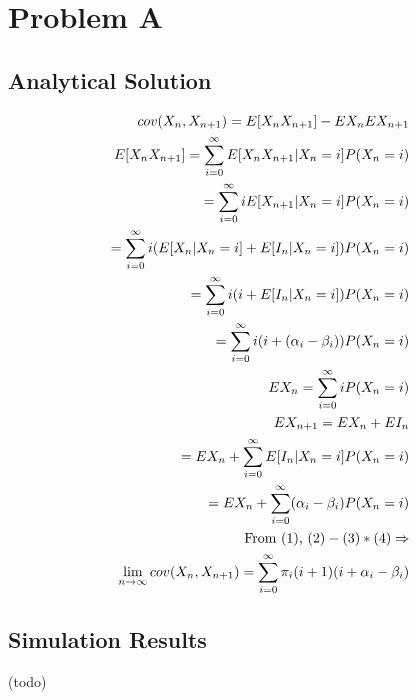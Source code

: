 \documentclass{article}
\begin{document}
\section{Problem A}
\subsection{Analytical Solution}
\begin{align}
cov(X_n,X_{n+1})=E[X_nX_{n+1}]-EX_nEX_{n+1} \\
E[X_nX_{n+1}]=\sum_{i=0}^{\infty}E[X_nX_{n+1}|X_n=i]P(X_n=i) \\
=\sum_{i=0}^{\infty}iE[X_{n+1}|X_n=i]P(X_n=i) \notag\\
=\sum_{i=0}^{\infty}i(E[X_n|X_n=i]+E[I_n|X_n=i])P(X_n=i) \notag\\
=\sum_{i=0}^{\infty}i(i+E[I_n|X_n=i])P(X_n=i) \notag\\
=\sum_{i=0}^{\infty}i(i+(\alpha_i-\beta_i))P(X_n=i) \notag\\
EX_n=\sum_{i=0}^{\infty}iP(X_n=i) \\
EX_{n+1}=EX_n+EI_n \\
=EX_n+\sum_{i=0}^{\infty}E[I_n|X_n=i]P(X_n=i) \notag\\
=EX_n+\sum_{i=0}^{\infty}(\alpha_i-\beta_i)P(X_n=i) \notag\\
\text{From (1), }(2)-(3)*(4)\Rightarrow \notag\\
\lim_{n\rightarrow\infty}cov(X_n,X_{n+1})=\sum_{i=0}^{\infty}\pi_i(i+1)(i+\alpha_i-\beta_i)
\end{align}
\subsection{Simulation Results}
(todo)
\end{document}
